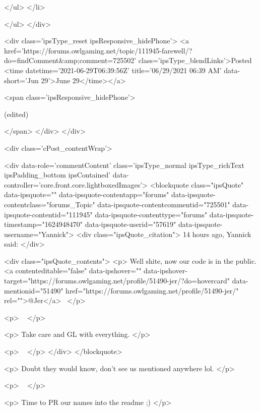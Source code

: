                        
						
						
						
							
								
							
							
							
							
							
							
						
					</ul>
				</li>
				
			</ul>
		</div>

		<div class='ipsType_reset ipsResponsive_hidePhone'>
			<a href='https://forums.owlgaming.net/topic/111945-farewell/?do=findComment&amp;comment=725502' class='ipsType_blendLinks'>Posted <time datetime='2021-06-29T06:39:56Z' title='06/29/2021 06:39  AM' data-short='Jun 29'>June 29</time></a> 
			
			<span class='ipsResponsive_hidePhone'>
				
					(edited)
				
				
			</span>
		</div>
	</div>

	

    

	<div class='cPost_contentWrap'>
		
		<div data-role='commentContent' class='ipsType_normal ipsType_richText ipsPadding_bottom ipsContained' data-controller='core.front.core.lightboxedImages'>
			<blockquote class="ipsQuote" data-ipsquote="" data-ipsquote-contentapp="forums" data-ipsquote-contentclass="forums_Topic" data-ipsquote-contentcommentid="725501" data-ipsquote-contentid="111945" data-ipsquote-contenttype="forums" data-ipsquote-timestamp="1624948470" data-ipsquote-userid="57619" data-ipsquote-username="Yannick">
	<div class="ipsQuote_citation">
		14 hours ago, Yannick said:
	</div>

	<div class="ipsQuote_contents">
		<p>
			Well shite, now our code is in the public. <a contenteditable="false" data-ipshover="" data-ipshover-target="https://forums.owlgaming.net/profile/51490-jer/?do=hovercard" data-mentionid="51490" href="https://forums.owlgaming.net/profile/51490-jer/" rel="">@Jer</a> 
		</p>

		<p>
			 
		</p>

		<p>
			Take care and GL with everything.
		</p>

		<p>
			 
		</p>
	</div>
</blockquote>

<p>
	Doubt they would know, don’t see us mentioned anywhere lol.
</p>

<p>
	 
</p>

<p>
	Time to PR our names into the readme ;)
</p>


